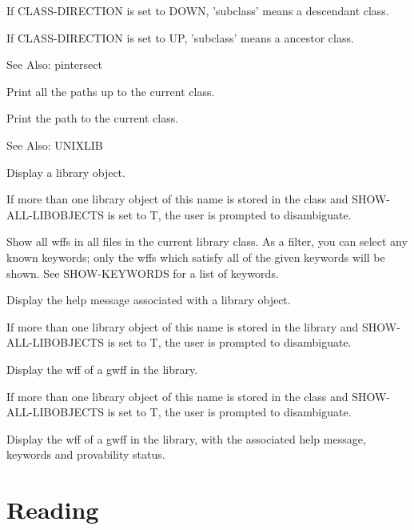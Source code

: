 \begin{description}
If CLASS-DIRECTION is set to DOWN, 'subclass' means a descendant class.

If CLASS-DIRECTION is set to UP, 'subclass' means a ancestor class.

See Also: pintersect

\item[PUP]  
Print all the paths up to the current class.

\item[PWD]  
Print the path to the current class.

See Also: UNIXLIB

\item[SHOW]  
Display a library object.

If more than one library object of this name is stored in
the class and SHOW-ALL-LIBOBJECTS is set to T,
the user is prompted to disambiguate.

\item[SHOW-ALL-WFFS]  
Show all wffs in all files in the current library class.
As a filter, you can select any known keywords; only the wffs which 
satisfy all of the given keywords will be shown. See SHOW-KEYWORDS 
for a list of keywords.

\item[SHOW-HELP]  
Display the help message associated with a library object.

If more than one library object of this name is stored in
the library and SHOW-ALL-LIBOBJECTS is set to T,
the user is prompted to disambiguate.

\item[SHOW-WFF]  
Display the wff of a gwff in the library.

If more than one library object of this name is stored in
the class and SHOW-ALL-LIBOBJECTS is set to T,
the user is prompted to disambiguate.

\item[SHOW-WFF\& HELP]  
Display the wff of a gwff in the library, with the associated
help message, keywords and provability status.
\item
\end{description}

\section{Reading}

